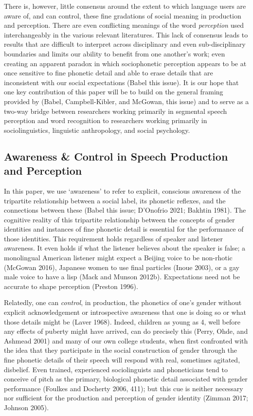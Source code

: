 \documentclass[
  letterpaper,
  DIV=11,
  numbers=noendperiod]{scrartcl}
\begin{document}
There is, however, little consensus around the extent to which language
users are aware of, and can control, these fine gradations of social
meaning in production and perception. There are even conflicting
meanings of the word \emph{perception} used interchangeably in the
various relevant literatures. This lack of consensus leads to results
that are difficult to interpret across disciplinary and even
sub-disciplinary boundaries and limits our ability to benefit from one
another's work; even creating an apparent paradox in which sociophonetic
perception appears to be at once sensitive to fine phonetic detail and
able to erase details that are inconsistent with our social expectations
(Babel this issue). It is our hope that one key contribution of this
paper will be to build on the general framing provided by (Babel,
Campbell-Kibler, and McGowan, this issue) and to serve as a two-way
bridge between researchers working primarily in segmental speech
perception and word recognition to researchers working primarily in
sociolinguistics, linguistic anthropology, and social psychology.

\subsection{Awareness \& Control in Speech Production and
Perception}\label{sec-background}

In this paper, we use `awareness' to refer to explicit, conscious
awareness of the tripartite relationship between a social label, its
phonetic reflexes, and the connections between these (Babel this issue;
D'Onofrio 2021; Bakhtin 1981). The cognitive reality of this tripartite
relationship between the concepts of gender identities and instances of
fine phonetic detail is essential for the performance of those
identities. This requirement holds regardless of speaker and listener
awareness. It even holds if what the listener believes about the speaker
is false; a monolingual American listener might expect a Beijing voice
to be non-rhotic (McGowan 2016), Japanese women to use final particles
(Inoue 2003), or a gay male voice to have a lisp (Mack and Munson
2012b). Expectations need not be accurate to shape perception (Preston
1996).

Relatedly, one can \emph{control}, in production, the phonetics of one's
gender without explicit acknowledgement or introspective awareness that
one is doing so or what those details might be (Laver 1968). Indeed,
children as young as 4, well before any effects of puberty might have
arrived, can do precisely this (Perry, Ohde, and Ashmead 2001) and many
of our own college students, when first confronted with the idea that
they participate in the social construction of gender through the fine
phonetic details of their speech will respond with real, sometimes
agitated, disbelief. Even trained, experienced sociolinguists and
phoneticians tend to conceive of pitch as the primary, biological
phonetic detail associated with gender performance (Foulkes and Docherty
2006, 411); but this cue is neither necessary nor sufficient for the
production and perception of gender identity (Zimman 2017; Johnson
2005).
\end{document}
